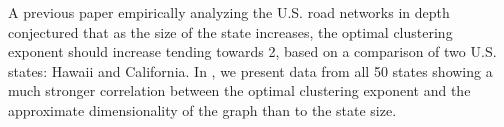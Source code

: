 A previous paper empirically analyzing the U.S. road networks in
depth~\cite{goodrich2022modeling} conjectured that as the size of the state
increases, the optimal clustering exponent should increase tending towards 2,
based on a comparison of two U.S. states: Hawaii and California. 
In , we present data from all 50 states showing
a much stronger correlation between the optimal clustering exponent and the
approximate dimensionality of the graph than to the state size.
